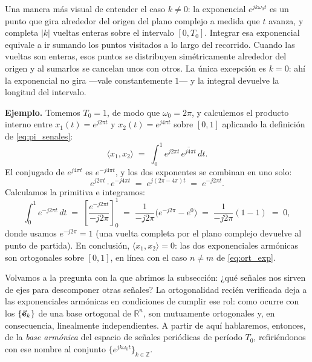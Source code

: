 \documentclass[class=book, crop=false]{standalone}
\begin{document}
Una manera más visual de entender el caso $k \neq 0$: la exponencial
$e^{jk\omega_0 t}$ es un punto que gira alrededor del origen del plano
complejo a medida que $t$ avanza, y completa $|k|$ vueltas enteras
sobre el intervalo $[0, T_0]$. Integrar esa exponencial equivale a ir
sumando los puntos visitados a lo largo del recorrido. Cuando las
vueltas son enteras, esos puntos se distribuyen simétricamente
alrededor del origen y al sumarlos se cancelan unos con otros. La
única excepción es $k = 0$: ahí la exponencial no gira —vale
constantemente $1$— y la integral devuelve la longitud del intervalo.

\medskip
\textbf{Ejemplo.}
Tomemos $T_0 = 1$, de modo que $\omega_0 = 2\pi$, y calculemos el
producto interno entre $x_1(t) = e^{j2\pi t}$ y $x_2(t) = e^{j4\pi t}$
sobre $[0, 1]$ aplicando la definición de
\eqref{eq:pi_senales}:
\begin{equation*}
    \langle x_1, x_2\rangle
    \;=\; \int_0^1 e^{j2\pi t}\,\overline{e^{j4\pi t}}\,dt.
\end{equation*}
El conjugado de $e^{j4\pi t}$ es $e^{-j4\pi t}$, y los dos exponentes
se combinan en uno solo:
\begin{equation*}
    e^{j2\pi t}\cdot e^{-j4\pi t}
    \;=\; e^{j(2\pi - 4\pi) t}
    \;=\; e^{-j2\pi t}.
\end{equation*}
Calculamos la primitiva e integramos:
\begin{equation*}
    \int_0^1 e^{-j2\pi t}\,dt
    \;=\; \left[\frac{e^{-j2\pi t}}{-j2\pi}\right]_0^1
    \;=\; \frac{1}{-j2\pi}\bigl(e^{-j2\pi} - e^{0}\bigr)
    \;=\; \frac{1}{-j2\pi}(1 - 1)
    \;=\; 0,
\end{equation*}
donde usamos $e^{-j2\pi} = 1$ (una vuelta completa por el plano
complejo devuelve al punto de partida). En conclusión,
$\langle x_1, x_2\rangle = 0$: las dos exponenciales armónicas son
ortogonales sobre $[0, 1]$, en línea con el caso $n \neq m$ de
\eqref{eq:ort_exp}.

\medskip
Volvamos a la pregunta con la que abrimos la subsección: ¿qué señales
nos sirven de ejes para descomponer otras señales? La ortogonalidad
recién verificada deja a las exponenciales armónicas en condiciones
de cumplir ese rol: como ocurre con los $\{\vec{\mathbf{e}}_k\}$ de una
base ortogonal de $\mathbb{R}^n$, son mutuamente ortogonales y, en
consecuencia, linealmente independientes. A partir de aquí
hablaremos, entonces, de la \emph{base armónica} del espacio de
señales periódicas de período $T_0$, refiriéndonos con ese nombre al
conjunto $\{e^{jk\omega_0 t}\}_{k\in\mathbb{Z}}$.
\end{document}
